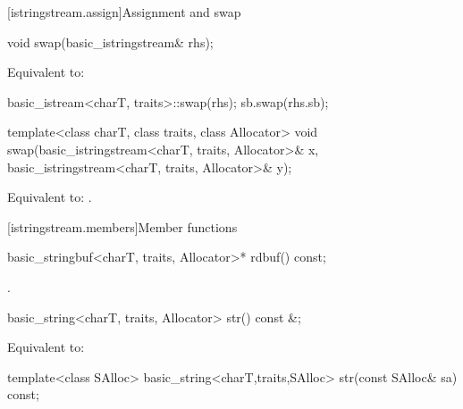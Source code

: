 [istringstream.assign]{Assignment and swap}

%
\begin{itemdecl}
void swap(basic_istringstream& rhs);
\end{itemdecl}

\begin{itemdescr}
\pnum
\effects
Equivalent to:
\begin{codeblock}
basic_istream<charT, traits>::swap(rhs);
sb.swap(rhs.sb);
\end{codeblock}
\end{itemdescr}


%
\begin{itemdecl}
template<class charT, class traits, class Allocator>
  void swap(basic_istringstream<charT, traits, Allocator>& x,
            basic_istringstream<charT, traits, Allocator>& y);
\end{itemdecl}

\begin{itemdescr}
\pnum
\effects
Equivalent to: .
\end{itemdescr}

[istringstream.members]{Member functions}

%
\begin{itemdecl}
basic_stringbuf<charT, traits, Allocator>* rdbuf() const;
\end{itemdecl}

\begin{itemdescr}
\pnum
\returns
{}.
\end{itemdescr}

%
\begin{itemdecl}
basic_string<charT, traits, Allocator> str() const &;
\end{itemdecl}

\begin{itemdescr}
\pnum
\effects
Equivalent to: 
\end{itemdescr}

%
\begin{itemdecl}
template<class SAlloc>
  basic_string<charT,traits,SAlloc> str(const SAlloc& sa) const;
\end{itemdecl}

